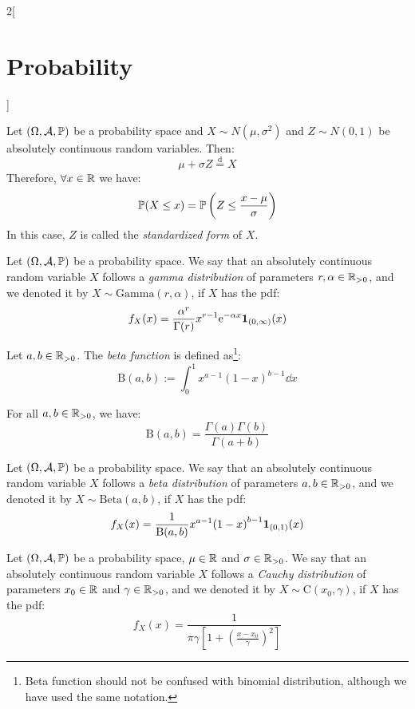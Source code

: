 \documentclass[../../../main.tex]{subfiles}
\begin{document}
\begin{multicols}{2}[\section{Probability}]
\begin{definition}
  \end{definition}
  \begin{center}
    \begin{minipage}{\linewidth}
      \centering
      
    \end{minipage}
  \end{center}
  \begin{prop}
    Let $(\Omega,\mathcal{A},\mathbb{P})$ be a probability space and $X\sim N(\mu,\sigma^2)$ and $Z\sim N(0,1)$ be absolutely continuous random variables. Then: $$\mu+\sigma Z\overset{\text{d}}{=} X$$ Therefore, $\forall x\in\mathbb{R}$ we have: $$\mathbb{P}(X\leq x)=\mathbb{P}\left(Z\leq\frac{x-\mu}{\sigma}\right)$$ In this case, $Z$ is called the \textit{standardized form} of $X$.
  \end{prop}
  \begin{definition}
    Let $(\Omega,\mathcal{A},\mathbb{P})$ be a probability space. We say that an absolutely continuous random variable $X$ follows a \textit{gamma distribution} of parameters $r,\alpha\in\mathbb{R}_{>0}$, and we denoted it by $X\sim \text{Gamma}(r,\alpha)$, if $X$ has the pdf: $$f_X(x)=\frac{\alpha^r}{\Gamma(r)}x^{r-1}\mathrm{e}^{-\alpha x}\boldsymbol{\mathrm{1}}_{(0,\infty)}(x)$$
  \end{definition}
  \begin{definition}
    Let $a,b\in\mathbb{R}_{>0}$. The \textit{beta function} is defined as\footnote{Beta function should not be confused with binomial distribution, although we have used the same notation.}: $$\text{B}(a,b):=\int_0^1x^{a-1}{(1-x)}^{b-1}\dd x$$
  \end{definition}
  \begin{prop}
    For all $a,b\in\mathbb{R}_{>0}$, we have: $$\text{B}(a,b)=\frac{\Gamma(a)\Gamma(b)}{\Gamma(a+b)}$$
  \end{prop}
  \begin{definition}
    Let $(\Omega,\mathcal{A},\mathbb{P})$ be a probability space. We say that an absolutely continuous random variable $X$ follows a \textit{beta distribution} of parameters $a,b\in\mathbb{R}_{>0}$, and we denoted it by $X\sim \text{Beta}(a,b)$, if $X$ has the pdf: $$f_X(x)=\frac{1}{\text{B}(a,b)}x^{a-1}{(1-x)}^{b-1}\boldsymbol{\mathrm{1}}_{(0,1)}(x)$$
  \end{definition}
  \begin{definition}
    Let $(\Omega,\mathcal{A},\mathbb{P})$ be a probability space, $\mu\in\mathbb{R}$ and $\sigma\in\mathbb{R}_{>0}$. We say that an absolutely continuous random variable $X$ follows a \textit{Cauchy distribution} of parameters $x_0\in\mathbb{R}$ and $\gamma\in\mathbb{R}_{>0}$, and we denoted it by $X\sim \text{C}(x_0,\gamma)$, if $X$ has the pdf: $$f_X(x)=\frac{1}{\pi\gamma\left[1+{\left(\frac{x-x_0}{\gamma}\right)}^2\right]}$$

\end{definition}
\end{multicols}
\end{document}
